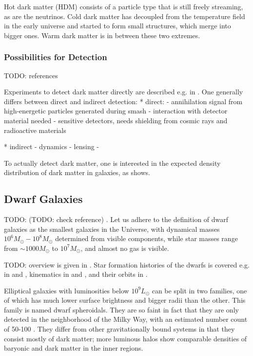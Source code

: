 \documentclass[useAMS,usenatbib]{mn2e}
\begin{document}
Hot dark matter (HDM) consists of a particle type that is still freely
streaming, as are the neutrinos.  Cold dark matter has decoupled from
the temperature field in the early universe and started to form small
structures, which merge into bigger ones.  Warm dark matter is in
between these two extremes.

\subsubsection{Possibilities for Detection}
TODO: references

Experiments to detect dark matter directly are described e.g. in \citep{Schnee2011}. One generally differs between direct and indirect detection:
* direct:
  - annihilation signal from high-energetic particles generated during smash
  - interaction with detector material needed
  - sensitive detectors, needs shielding from cosmic rays and radioactive materials

* indirect
  - dynamics
  - lensing
  - 

  To actually detect dark matter, one is interested in the expected
  density distribution of dark matter in galaxies, as
  \citep{Navarro1996} shows.
\subsection{Dwarf Galaxies}
TODO: (TODO: check reference) \citep{Ostriker2003}. Let us adhere to
the definition of dwarf galaxies as the smallest galaxies in the
Universe, with dynamical masses $10^6M_\odot-10^8M_\odot$ determined
from visible components, while star masses range from
$\sim1000M_\odot$ to $10^7M_\odot$, and almost no gas is visible.

TODO: overview is given in \citep{Mateo1998}. Star formation histories
of the dwarfs is covered e.g. in \citep{Skillman2005} and
\citep{Dolphin2005}, kinematics in \citep{Walker2009} and
\citep{Simon2007}, and their orbits in \citep{Lux2010}.

Elliptical galaxies with luminosities below $10^9L_\odot$ can be split
in two families, one of which has much lower surface brightness and
bigger radii than the other. This family is named dwarf
spheroidals. They are so faint in fact that they are only detected in
the neighborhood of the Milky Way, with an estimated number count of
50-100 \citep{Belokurov2007}. They differ from other gravitationally
bound systems in that they consist mostly of dark matter; more
luminous halos show comparable densities of baryonic and dark matter
in the inner regions.
\end{document}
